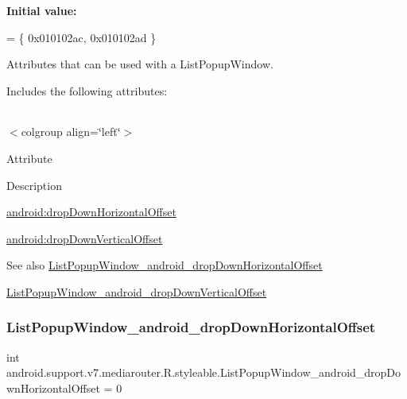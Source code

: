{\bfseries Initial value\+:}
\begin{DoxyCode}
= \{
            0x010102ac, 0x010102ad
        \}
\end{DoxyCode}
Attributes that can be used with a List\+Popup\+Window. 

Includes the following attributes\+:

\tabulinesep=1mm
\begin{longtabu} spread 0pt [c]{*{0}{|X[-1]}|}
\hline
\end{longtabu}
$<$colgroup align=\char`\"{}left\char`\"{}$>$ 

Attribute

Description 

{\ttfamily \hyperlink{classandroid_1_1support_1_1v7_1_1mediarouter_1_1R_1_1styleable_aff37d4b141af98f69d0a815b8206f3a0}{android\+:drop\+Down\+Horizontal\+Offset}}

{\ttfamily \hyperlink{classandroid_1_1support_1_1v7_1_1mediarouter_1_1R_1_1styleable_a26f2cebc2eb4324dd371516539bed16b}{android\+:drop\+Down\+Vertical\+Offset}}

\begin{DoxySeeAlso}{See also}
\hyperlink{classandroid_1_1support_1_1v7_1_1mediarouter_1_1R_1_1styleable_aff37d4b141af98f69d0a815b8206f3a0}{List\+Popup\+Window\+\_\+android\+\_\+drop\+Down\+Horizontal\+Offset} 

\hyperlink{classandroid_1_1support_1_1v7_1_1mediarouter_1_1R_1_1styleable_a26f2cebc2eb4324dd371516539bed16b}{List\+Popup\+Window\+\_\+android\+\_\+drop\+Down\+Vertical\+Offset} 
\end{DoxySeeAlso}
\mbox{\label{classandroid_1_1support_1_1v7_1_1mediarouter_1_1R_1_1styleable_aff37d4b141af98f69d0a815b8206f3a0}} 
\subsubsection{\texorpdfstring{List\+Popup\+Window\+\_\+android\+\_\+drop\+Down\+Horizontal\+Offset}{ListPopupWindow\_android\_dropDownHorizontalOffset}}
{\footnotesize\ttfamily int android.\+support.\+v7.\+mediarouter.\+R.\+styleable.\+List\+Popup\+Window\+\_\+android\+\_\+drop\+Down\+Horizontal\+Offset = 0\hspace{0.3cm}{\ttfamily [static]}}

